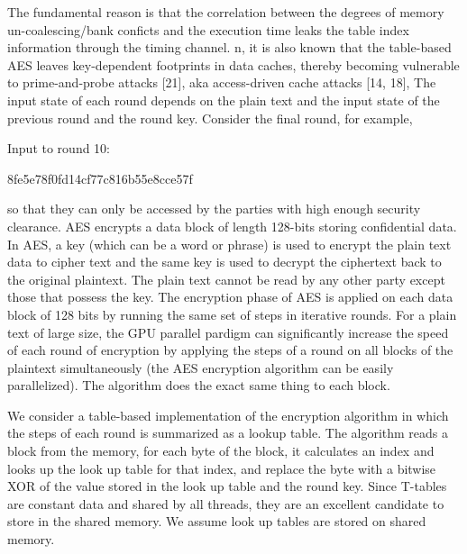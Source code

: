 The fundamental reason is that the correlation between the degrees of memory un-coalescing/bank
conficts and the execution time leaks the table index information through the timing channel.
%
n, it is also known that
the table-based AES leaves key-dependent footprints in data
caches, thereby becoming vulnerable to prime-and-probe attacks [21], aka access-driven cache attacks [14, 18],
The input state of each round depends on the plain text and the input state of the previous round and the round key.
%
Consider the final round, for example,

Input to round 10:

8fe5e78f0fd14cf77c816b55e8cce57f



so that they can only be accessed by the parties with high enough security clearance.
%
AES encrypts a data block of length 128-bits storing confidential data.
% 
In AES, a key (which can be a word or phrase) is used to encrypt the plain text data to cipher text and the same key is used to decrypt the ciphertext back to the original plaintext.
%
The plain text cannot be read by any other party except those that possess the key.
%
The encryption phase of AES is applied on each data block of 128 bits by running the same set of steps in iterative rounds.
%
%
For a plain text of large size, the GPU parallel pardigm can significantly increase the speed of each round of encryption by applying the steps of a round on all blocks of the plaintext simultaneously (the AES encryption algorithm can be easily parallelized).
%
The algorithm does the exact same thing to each block.


We consider a table-based implementation of the encryption algorithm in which the steps of each round is summarized as a lookup table.
%
The algorithm reads a block from the memory, for each byte of the block, it calculates an index and looks up the look up table for that index, and replace the byte with a bitwise XOR of the value stored in the look up table and the round key.
%
Since T-tables are constant data and shared by all threads, they are an excellent candidate to store in the shared memory. We assume look up tables are stored on shared memory.
%

